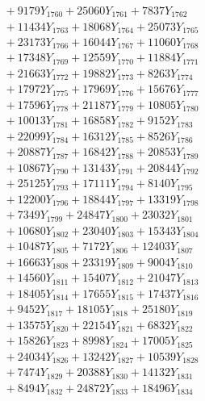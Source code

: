 \documentclass[a4paper,10pt]{article}
\begin{document}
{\begin{align}
&\;  + 9179 Y_{1760} + 25060 Y_{1761} + 7837 Y_{1762} \\[0.3ex]
&\;  + 11434 Y_{1763} + 18068 Y_{1764} + 25073 Y_{1765} \\[0.3ex]
&\;  + 23173 Y_{1766} + 16044 Y_{1767} + 11060 Y_{1768} \\[0.5ex]\allowbreak
&\;  + 17348 Y_{1769} + 12559 Y_{1770} + 11884 Y_{1771} \\[0.3ex]
&\;  + 21663 Y_{1772} + 19882 Y_{1773} + 8263 Y_{1774} \\[0.3ex]
&\;  + 17972 Y_{1775} + 17969 Y_{1776} + 15676 Y_{1777} \\[0.3ex]
&\;  + 17596 Y_{1778} + 21187 Y_{1779} + 10805 Y_{1780} \\[0.3ex]
&\;  + 10013 Y_{1781} + 16858 Y_{1782} + 9152 Y_{1783} \\[0.3ex]
&\;  + 22099 Y_{1784} + 16312 Y_{1785} + 8526 Y_{1786} \\[0.3ex]
&\;  + 20887 Y_{1787} + 16842 Y_{1788} + 20853 Y_{1789} \\[0.3ex]
&\;  + 10867 Y_{1790} + 13143 Y_{1791} + 20844 Y_{1792} \\[0.3ex]
&\;  + 25125 Y_{1793} + 17111 Y_{1794} + 8140 Y_{1795} \\[0.3ex]
&\;  + 12200 Y_{1796} + 18844 Y_{1797} + 13319 Y_{1798} \\[0.5ex]\allowbreak
&\;  + 7349 Y_{1799} + 24847 Y_{1800} + 23032 Y_{1801} \\[0.3ex]
&\;  + 10680 Y_{1802} + 23040 Y_{1803} + 15343 Y_{1804} \\[0.3ex]
&\;  + 10487 Y_{1805} + 7172 Y_{1806} + 12403 Y_{1807} \\[0.3ex]
&\;  + 16663 Y_{1808} + 23319 Y_{1809} + 9004 Y_{1810} \\[0.3ex]
&\;  + 14560 Y_{1811} + 15407 Y_{1812} + 21047 Y_{1813} \\[0.3ex]
&\;  + 18405 Y_{1814} + 17655 Y_{1815} + 17437 Y_{1816} \\[0.3ex]
&\;  + 9452 Y_{1817} + 18105 Y_{1818} + 25180 Y_{1819} \\[0.3ex]
&\;  + 13575 Y_{1820} + 22154 Y_{1821} + 6832 Y_{1822} \\[0.3ex]
&\;  + 15826 Y_{1823} + 8998 Y_{1824} + 17005 Y_{1825} \\[0.3ex]
&\;  + 24034 Y_{1826} + 13242 Y_{1827} + 10539 Y_{1828} \\[0.5ex]\allowbreak
&\;  + 7474 Y_{1829} + 20388 Y_{1830} + 14132 Y_{1831} \\[0.3ex]
&\;  + 8494 Y_{1832} + 24872 Y_{1833} + 18496 Y_{1834} \\[0.3ex]

\end{align}}
\end{document}
